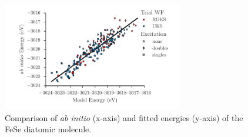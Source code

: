 \begin{figure}[htb]
\centering
\includegraphics[width=0.7\textwidth]{./Figures/fese.pdf}
  \caption{
    Comparison of \textit{ab initio} (x-axis) and fitted energies (y-axis) of the FeSe diatomic molecule.
  }
  \label{fig:fese}
\end{figure}
